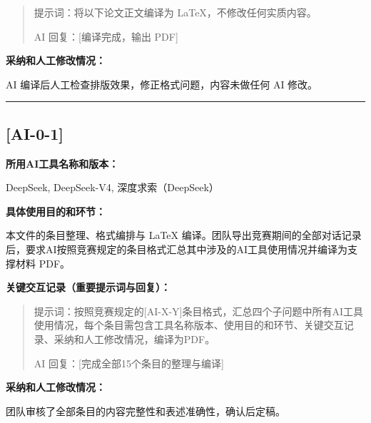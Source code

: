 \documentclass[12pt,a4paper]{ctexart}
\begin{document}
\begin{quote}
提示词：将以下论文正文编译为 LaTeX，不修改任何实质内容。

AI 回复：[编译完成，输出 PDF]
\end{quote}

\textbf{采纳和人工修改情况：}

AI 编译后人工检查排版效果，修正格式问题，内容未做任何 AI 修改。

\vspace{1em}
\hrule
\vspace{1em}

\subsection*{[AI-0-1]}

\textbf{所用AI工具名称和版本：}

DeepSeek, DeepSeek-V4, 深度求索（DeepSeek）

\textbf{具体使用目的和环节：}

本文件的条目整理、格式编排与 LaTeX 编译。团队导出竞赛期间的全部对话记录后，要求AI按照竞赛规定的条目格式汇总其中涉及的AI工具使用情况并编译为支撑材料 PDF。

\textbf{关键交互记录（重要提示词与回复）：}

\begin{quote}
提示词：按照竞赛规定的[AI-X-Y]条目格式，汇总四个子问题中所有AI工具使用情况，每个条目需包含工具名称版本、使用目的和环节、关键交互记录、采纳和人工修改情况，编译为PDF。

AI 回复：[完成全部15个条目的整理与编译]
\end{quote}

\textbf{采纳和人工修改情况：}

团队审核了全部条目的内容完整性和表述准确性，确认后定稿。
\end{document}
